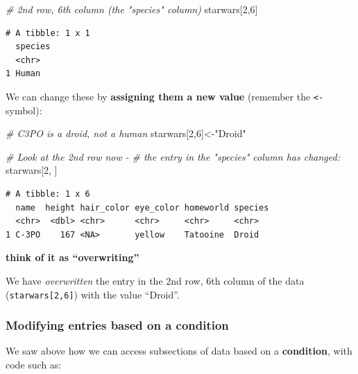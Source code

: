 \documentclass[]{book}
\newenvironment{Shaded}{\begin{snugshade}}{\end{snugshade}}
\newcommand{\CommentTok}[1]{\textcolor[rgb]{0.56,0.35,0.01}{\textit{#1}}}
\newcommand{\DecValTok}[1]{\textcolor[rgb]{0.00,0.00,0.81}{#1}}
\newcommand{\NormalTok}[1]{#1}
\newcommand{\OperatorTok}[1]{\textcolor[rgb]{0.81,0.36,0.00}{\textbf{#1}}}
\newcommand{\StringTok}[1]{\textcolor[rgb]{0.31,0.60,0.02}{#1}}
\begin{document}
\begin{Shaded}
\begin{Highlighting}[]
\CommentTok{# 2nd row, 6th column (the "species" column)}
\NormalTok{starwars[}\DecValTok{2}\NormalTok{,}\DecValTok{6}\NormalTok{]}
\end{Highlighting}
\end{Shaded}

\begin{verbatim}
# A tibble: 1 x 1
  species
  <chr>  
1 Human  
\end{verbatim}

We can change these by \textbf{assigning them a new value} (remember the \texttt{\textless{}-} symbol):

\begin{Shaded}
\begin{Highlighting}[]
\CommentTok{# C3PO is a droid, not a human}
\NormalTok{starwars[}\DecValTok{2}\NormalTok{,}\DecValTok{6}\NormalTok{]<-}\StringTok{"Droid"}

\CommentTok{# Look at the 2nd row now -}
\CommentTok{# the entry in the "species" column has changed:}
\NormalTok{starwars[}\DecValTok{2}\NormalTok{, ]}
\end{Highlighting}
\end{Shaded}

\begin{verbatim}
# A tibble: 1 x 6
  name  height hair_color eye_color homeworld species
  <chr>  <dbl> <chr>      <chr>     <chr>     <chr>  
1 C-3PO    167 <NA>       yellow    Tatooine  Droid  
\end{verbatim}

\textbf{think of it as ``overwriting''}

We have \emph{overwritten} the entry in the 2nd row, 6th column of the data (\texttt{starwars{[}2,6{]}}) with the value ``Droid''.

\hypertarget{modifying-entries-based-on-a-condition}{%
\subsubsection*{Modifying entries based on a condition}\label{modifying-entries-based-on-a-condition}}

We saw above how we can access subsections of data based on a \textbf{condition}, with code such as:

\begin{Shaded}
\end{Shaded}
\end{document}
